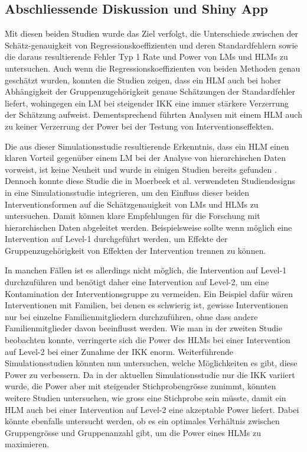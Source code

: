 \documentclass[12pt]{article}\usepackage[]{graphicx}\usepackage[]{color}
\begin{document}
\subsection{Abschliessende Diskussion und Shiny App}
Mit diesen beiden Studien wurde das Ziel verfolgt, die Unterschiede zwischen der Schätz-genauigkeit von Regressionskoeffizienten und deren Standardfehlern sowie die daraus resultierende Fehler Typ 1 Rate und Power von LMs und HLMs zu untersuchen. Auch wenn die Regressionskoeffizienten von beiden Methoden genau geschätzt wurden, konnten die Studien zeigen, dass ein HLM auch bei hoher Abhängigkeit der Gruppenzugehörigkeit genaue Schätzungen der Standardfehler liefert, wohingegen ein LM bei steigender IKK eine immer stärkere Verzerrung der Schätzung aufweist. Dementsprechend führten Analysen mit einem HLM auch zu keiner Verzerrung der Power bei der Testung von Interventionseffekten.

Die aus dieser Simulationsstudie resultierende Erkenntnis, dass ein HLM einen klaren Vorteil gegenüber einem LM bei der Analyse von hierarchischen Daten vorweist, ist keine Neuheit und wurde in einigen Studien bereits gefunden \citep{mcneish2014analyzing, MOERBEEK2003341, mundfrom2002monte, osborne2000advantages}. Dennoch konnte diese Studie die in Moerbeek et al. \citeyearpar{MOERBEEK2003341} verwendeten Studiendesigns in eine Simulationsstudie integrieren, um den Einfluss dieser beiden Interventionsformen auf die Schätzgenauigkeit von LMs und HLMs zu untersuchen. Damit können klare Empfehlungen für die Forschung mit hierarchischen Daten abgeleitet werden. Beispielsweise sollte wenn möglich eine Intervention auf Level-1 durchgeführt werden, um Effekte der Gruppenzugehörigkeit von Effekten der Intervention trennen zu können. 

In manchen Fällen ist es allerdings nicht möglich, die Intervention auf Level-1 durchzuführen und benötigt daher eine Intervention auf Level-2, um eine Kontamination der Interventionsgruppe zu vermeiden. Ein Beispiel dafür wären Interventionen mit Familien, bei denen es schwierig ist, gewisse Interventionen nur bei einzelne Familienmitgliedern durchzuführen, ohne dass andere Familienmitglieder davon beeinflusst werden. Wie man in der zweiten Studie beobachten konnte, verringerte sich die Power des HLMs bei einer Intervention auf Level-2 bei einer Zunahme der IKK enorm. Weiterführende Simulationsstudien könnten nun untersuchen, welche Möglichkeiten es gibt, diese Power zu verbessern. Da in der aktuellen Simulationsstudie nur die IKK variiert wurde, die Power aber mit steigender Stichprobengrösse zunimmt, könnten weitere Studien untersuchen, wie gross eine Stichprobe sein müsste, damit ein HLM auch bei einer Intervention auf Level-2 eine akzeptable Power liefert. Dabei könnte ebenfalls untersucht werden, ob es ein optimales Verhältnis zwischen Gruppengrösse und Gruppenanzahl gibt, um die Power eines HLMs zu maximieren.
\end{document}

